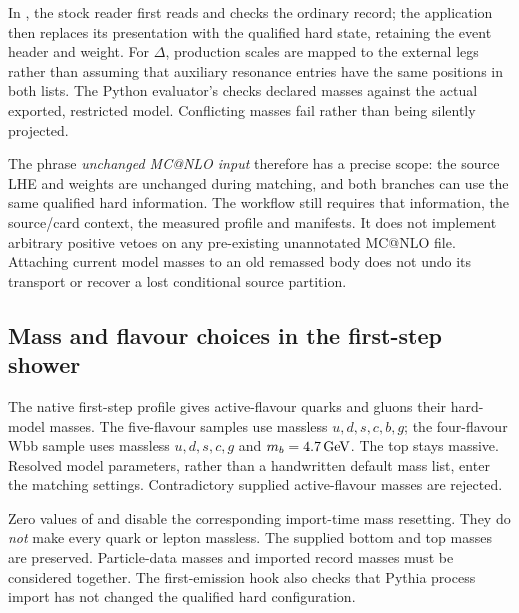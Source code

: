 In , the stock reader first reads and checks
the ordinary record; the application then replaces its presentation
with the qualified hard state, retaining the event header and weight.
For $\Delta$, production scales are mapped to the external legs
rather than assuming that auxiliary resonance entries have the same
positions in both lists.
The Python evaluator's
 checks declared masses
against the actual exported, restricted model.
Conflicting masses fail rather than being silently projected.

The phrase \emph{unchanged MC@NLO input} therefore has a precise scope:
the source LHE and weights are unchanged during matching, and both
branches can use the same qualified hard information.
The workflow still requires that information, the source/card context,
the measured profile and manifests.
It does not implement arbitrary positive vetoes on any pre-existing
unannotated MC@NLO file.
Attaching current model masses to an old remassed body does not
undo its transport or recover a lost conditional source partition.

\subsection{Mass and flavour choices in the first-step shower}
\label{sec:masses-shower}

The native first-step profile gives active-flavour quarks and gluons
their hard-model masses.
The five-flavour samples use massless $u,d,s,c,b,g$; the four-flavour
Wbb sample uses massless $u,d,s,c,g$ and $m_b=4.7\,\mathrm{GeV}$.
The top stays massive.
Resolved model parameters, rather than a handwritten default mass
list, enter the matching settings.
Contradictory supplied active-flavour masses are rejected.

Zero values of  and
 disable the corresponding import-time
mass resetting. They do \emph{not} make every quark or lepton massless.
The supplied bottom and top masses are preserved.
Particle-data masses and imported record masses must be considered
together.
The first-emission hook also checks that Pythia process import has
not changed the qualified hard configuration.

